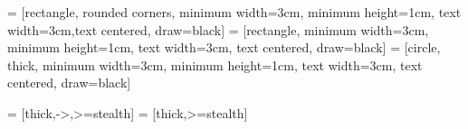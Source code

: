 \usepackage{listings}

\usepackage{csquotes} %






\usepackage{setspace} %

\usepackage{indentfirst} 	%
\usepackage{graphicx}		%
\usepackage{float}			%
\usepackage{setspace}   	%
\usepackage{textcomp}   	%
\usepackage{url}       		%
\usepackage{hyperref}		%
\usepackage[all]{hypcap}	%
\hypersetup{colorlinks,     %
			breaklinks,
			linkcolor=darkblue,
			urlcolor=darkblue,
			anchorcolor=darkblue,
			citecolor=darkblue}
\usepackage[perpage,para,symbol]{footmisc} %
\usepackage{tikz,fp,ifthen}
\usepackage{pgfmath}
\usetikzlibrary{backgrounds}
\usetikzlibrary{decorations.pathmorphing,backgrounds,fit,calc,through}
\usetikzlibrary{arrows}
\usetikzlibrary{decorations,shadows}
\usetikzlibrary{fadings}
\usetikzlibrary{patterns}
\usetikzlibrary{mindmap}
\usetikzlibrary{decorations.text}
\usetikzlibrary{decorations.shapes}

\usetikzlibrary{shapes.geometric, arrows}
\usetikzlibrary{arrows.meta, positioning}
\usetikzlibrary{arrows}

 = [rectangle, rounded corners, minimum width=3cm, minimum height=1cm, text width=3cm,text centered, draw=black] %
 = [rectangle, minimum width=3cm, minimum height=1cm, text width=3cm, text centered, draw=black] %
 = [circle, thick, minimum width=3cm, minimum height=1cm, text width=3cm, text centered, draw=black] %

 = [thick,->,>=stealth]
 = [thick,>=stealth]

